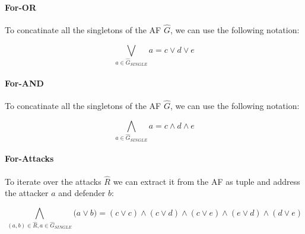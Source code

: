 \paragraph{For-OR} To concatinate all the singletons of the AF $\hat{G}$, we can use the following notation:

$$
\bigvee_{a \in \hat{G}_{\!S\!I\!N\!G\!L\!E}} a = c \lor d \lor e
$$

\paragraph{For-AND} To concatinate all the singletons of the AF $\hat{G}$, we can use the following notation:

$$
\bigwedge_{a \in \hat{G}_{\!S\!I\!N\!G\!L\!E}} a = c \land d \land e
$$

\paragraph{For-Attacks} To iterate over the attacks $\hat{R}$ we can extract it from the AF as tuple and address the attacker $a$ and defender $b$:

$$
\bigwedge_{(a, b) \in \hat{R}, a\in \hat{G}_{\!S\!I\!N\!G\!L\!E}} \big( a \lor b \big) = (c \lor c) \land
(c \lor d) \land (c \lor e) \land (e \lor d) \land (d \lor e)
$$